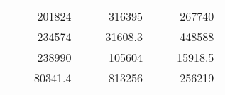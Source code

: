 \begin{table}[H]
\begin{tabular}{|ccrccrccc}
\rowcolor[HTML]{DAE8FC} 
\multicolumn{1}{|c|}{\cellcolor[HTML]{FFFFC7}}                                & \multicolumn{1}{c|}{\cellcolor[HTML]{DAE8FC}}                      & \multicolumn{1}{r|}{\cellcolor[HTML]{DAE8FC}201824}    & \multicolumn{1}{c|}{\cellcolor[HTML]{FFFFC7}}                                & \multicolumn{1}{c|}{\cellcolor[HTML]{DAE8FC}}                       & \multicolumn{1}{r|}{\cellcolor[HTML]{DAE8FC}316395}    & \multicolumn{1}{c|}{\cellcolor[HTML]{FFFFC7}}                                & \multicolumn{1}{c|}{\cellcolor[HTML]{DAE8FC}}                      & \multicolumn{1}{r|}{\cellcolor[HTML]{DAE8FC}267740}    \\ \cline{3-3} \cline{6-6} \cline{9-9} 
\multicolumn{1}{|c|}{\cellcolor[HTML]{FFFFC7}}                                & \multicolumn{1}{c|}{\cellcolor[HTML]{DAE8FC}}                      & \multicolumn{1}{r|}{\cellcolor[HTML]{DDFDFF}234574}    & \multicolumn{1}{c|}{\cellcolor[HTML]{FFFFC7}}                                & \multicolumn{1}{c|}{\cellcolor[HTML]{DAE8FC}}                       & \multicolumn{1}{r|}{\cellcolor[HTML]{DDFDFF}31608.3}   & \multicolumn{1}{c|}{\cellcolor[HTML]{FFFFC7}}                                & \multicolumn{1}{c|}{\cellcolor[HTML]{DAE8FC}}                      & \multicolumn{1}{r|}{\cellcolor[HTML]{DDFDFF}448588}    \\ \cline{3-3} \cline{6-6} \cline{9-9} 
\rowcolor[HTML]{DAE8FC} 
\multicolumn{1}{|c|}{\cellcolor[HTML]{FFFFC7}}                                & \multicolumn{1}{c|}{\cellcolor[HTML]{DAE8FC}}                      & \multicolumn{1}{r|}{\cellcolor[HTML]{DAE8FC}238990}    & \multicolumn{1}{c|}{\cellcolor[HTML]{FFFFC7}}                                & \multicolumn{1}{c|}{\cellcolor[HTML]{DAE8FC}}                       & \multicolumn{1}{r|}{\cellcolor[HTML]{DAE8FC}105604}    & \multicolumn{1}{c|}{\cellcolor[HTML]{FFFFC7}}                                & \multicolumn{1}{c|}{\cellcolor[HTML]{DAE8FC}}                      & \multicolumn{1}{r|}{\cellcolor[HTML]{DAE8FC}15918.5}   \\ \cline{3-3} \cline{6-6} \cline{9-9} 
\multicolumn{1}{|c|}{\cellcolor[HTML]{FFFFC7}}                                & \multicolumn{1}{c|}{\cellcolor[HTML]{DAE8FC}}                      & \multicolumn{1}{r|}{\cellcolor[HTML]{DDFDFF}80341.4}   & \multicolumn{1}{c|}{\cellcolor[HTML]{FFFFC7}}                                & \multicolumn{1}{c|}{\cellcolor[HTML]{DAE8FC}}                       & \multicolumn{1}{r|}{\cellcolor[HTML]{DDFDFF}813256}    & \multicolumn{1}{c|}{\cellcolor[HTML]{FFFFC7}}                                & \multicolumn{1}{c|}{\cellcolor[HTML]{DAE8FC}}                      & \multicolumn{1}{r|}{\cellcolor[HTML]{DDFDFF}256219}    \\ \cline{3-3} \cline{6-6} \cline{9-9} 

\end{tabular}
\end{table}
